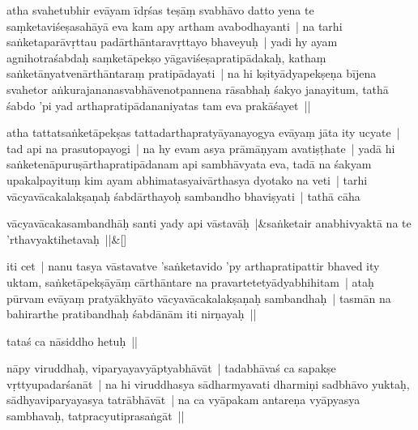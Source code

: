 \documentclass[article,12pt,a4paper]{memoir}%
\newcounter{parCount}
\begin{document}
	  
	  \pstart \leavevmode%
	\label{thakur75-100.22}atha svahetubhir evāyam īdṛśas teṣāṃ svabhāvo datto yena te saṃketaviśeṣasahāyā eva kam apy artham avabodhayanti | na tarhi saṅketaparāvṛttau padārthāntaravṛttayo bhaveyuḥ | yadi hy ayam agnihotraśabdaḥ saṃketāpekṣo yāgaviśeṣapratipādakaḥ, kathaṃ saṅketānyatvenārthāntaraṃ pratipādayati | na hi kṣityādyapekṣeṇa bījena svahetor aṅkurajananasvabhāvenotpannena rāsabhaḥ śakyo janayitum, tathā śabdo 'pi yad arthapratipādananiyatas tam eva prakāśayet || 
	{}
	\pend%
      

	  
	  \pstart \leavevmode%
	\label{thakur75-100.27}atha tattatsaṅketāpekṣas tattadarthapratyāyanayogya evāyaṃ jāta ity ucyate | tad api na prasutopayogi | na hy evam asya prāmāṇyam avatiṣṭhate | yadā hi saṅketenāpuruṣārthapratipādanam api sambhāvyata eva, tadā na śakyam upakalpayituṃ kim ayam abhimatasyaivārthasya dyotako na veti | tarhi vācyavācakalakṣaṇaḥ śabdārthayoḥ sambandho bhaviṣyati | tathā cāha
	{}
	\pend%
      
	    
	    \stanza[\smallbreak]
	  vācyavācakasambandhāḥ santi yady api vāstavāḥ |&saṅketair anabhivyaktā na te 'rthavyaktihetavaḥ ||\&[\smallbreak]
	  
	  
	  

	  
	  \pstart \leavevmode%
	iti cet | nanu tasya vāstavatve 'saṅketavido 'py arthapratipattir bhaved ity uktam, saṅketāpekṣāyāṃ cārthāntare na pravartetetyādyabhihitam | ataḥ pūrvam evāyaṃ pratyākhyāto vācyavācakalakṣaṇaḥ sambandhaḥ | tasmān na bahirarthe pratibandhaḥ śabdānām iti nirṇayaḥ ||
	{}
	\pend%
      

	  
	  \pstart \leavevmode%
	tataś ca nāsiddho hetuḥ ||
	{}
	\pend%
      

	  
	  \pstart \leavevmode%
	\label{thakur75-101.6}nāpy viruddhaḥ, viparyayavyāptyabhāvāt | tadabhāvaś ca sapakṣe vṛttyupadarśanāt | na hi viruddhasya sādharmyavati dharmiṇi sadbhāvo yuktaḥ, sādhyaviparyayasya tatrābhāvāt | na ca vyāpakam antareṇa vyāpyasya sambhavaḥ, tatpracyutiprasaṅgāt || 
	{}
	\pend%
      
\end{document}
